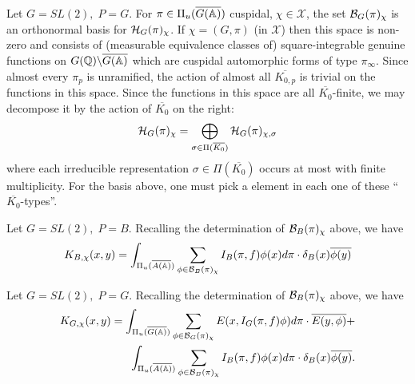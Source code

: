 \begin{example}
Let $G=SL(2),\;P=G$. For $\pi \in \Pi _u(\overline{G(\mathbb{A} )})$
cuspidal,$\;\chi \in 
\mathcal{X}$, the set ${\cal{B}}_G(\pi )_\chi $ is an orthonormal basis
for ${\cal{H}}_G(\pi )_\chi $. If $\chi = (G,\pi )$
(in $\mathcal{X}$) then this space is non-zero and consists of
(measurable equivalence classes of) square-integrable
genuine functions on $G(\mathbb{Q} )\backslash \overline{G(\mathbb{A} )}$
which are cuspidal automorphic forms of type $\pi_\infty $.
Since almost every $\pi _p$ is unramified, the action of almost
all $\overline{K_{0,p}}$ is trivial on the
functions in this space. Since the functions in
this space are all $\overline{K_0}$-finite,
we may decompose it by the action of $\overline{K_0}$ on
the right: 
\[
{\cal{H}}_G(\pi )_\chi =
\bigoplus_{\sigma \in \Pi(\overline{K_0})}
{\cal{H}}_G(\pi )_{\chi ,\sigma }
\]
where each irreducible representation
$\sigma \in \Pi(\overline{K_0})$ occurs at
most with finite multiplicity. For the basis above, one must pick a element
in each one of these ``$\overline{K_0}$-types''.
\end{example}

\begin{example}
Let $G=SL(2),\;P=B$. Recalling the determination of
${\cal{B}}_B(\pi)_\chi $ above, we have 
\[
K_{B,\chi }(x,y)
=\int_{\Pi _u(\overline{A(\mathbb{A} )})}
\sum_{\phi \in {\cal{B}}_B(\pi)_\chi }
I_B(\pi ,f)\phi (x)d\pi \cdot \delta _B(x)\overline{\phi (y)}
\]
\end{example}

\begin{example}
Let $G=SL(2),\;P=G$. Recalling the determination
of ${\cal{B}}_B(\pi)_\chi $ above, we have 
\begin{eqnarray*}
K_{G,\chi }(x,y)
=\int_{\Pi _u(\overline{G(\mathbb{A} )})}
\sum_{\phi \in {\cal{B}}_G(\pi)_\chi }
E(x,I_G(\pi ,f)\phi )d\pi \cdot \overline{E(y,\phi )}+ \\
\int_{\Pi _u(\overline{A(\mathbb{A} )})}
\sum_{\phi \in {\cal{B}}_B(\pi )_\chi }
I_B(\pi,f)\phi (x)d\pi \cdot \delta _B(x)\overline{\phi (y)}.
\end{eqnarray*}
\end{example}

